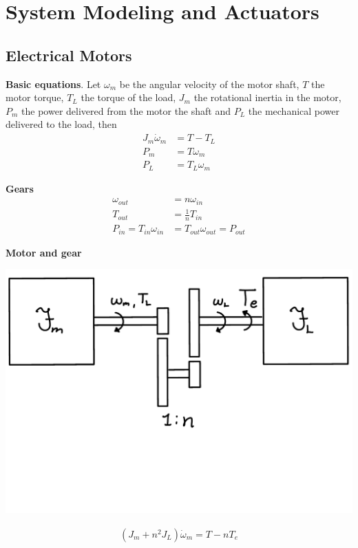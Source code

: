 \section{System Modeling and Actuators}

\setcounter{section}{3}
\setcounter{subsection}{1}
\subsection{Electrical Motors} %

\textbf{Basic equations}. Let \(\omega_m\) be the angular velocity of the motor
shaft, \(T\) the motor torque, \(T_L\) the torque of the load, \(J_m\) the
rotational inertia in the motor, \(P_m\) the power delivered from the motor the
shaft and \(P_L\) the mechanical power delivered to the load, then
\begin{align*}
    J_m\dot{\omega}_m &= T - T_L \\
    P_m & = T\omega_m \\
    P_L & = T_L\omega_m
\end{align*}

\textbf{Gears}
\begin{align*}
    \omega_{out} &= n\omega_{in} \\
    T_{out} &= \frac{1}{n}T_{in} \\
    P_{in} = T_{in}\omega_{in} &= T_{out}\omega_{out} = P_{out}
\end{align*}

\textbf{Motor and gear}
\begin{Figure}
    \includegraphics[clip, trim = 0cm 5cm 0cm 0cm,width=\linewidth]{figures/gears.pdf}
    \label{fig:gears}
\end{Figure}
\begin{align*}
    (J_m+n^2J_L)\dot{\omega}_m = T - nT_e
\end{align*}

